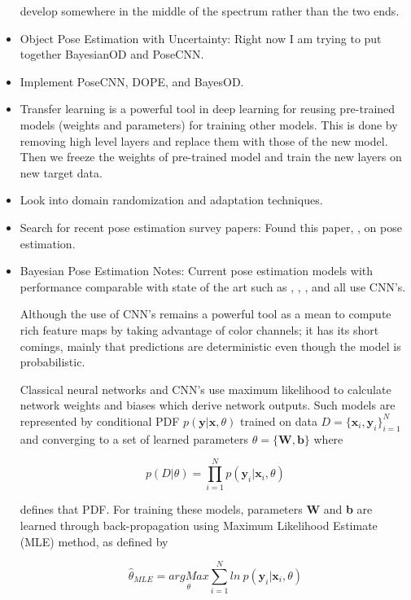 \documentclass[11pt]{article}
\begin{document}
\begin{itemize}
	      develop somewhere in the middle of the spectrum rather than the two ends.
	\item Object Pose Estimation with Uncertainty: Right now I am trying to put
	      together BayesianOD and PoseCNN.
	\item Implement PoseCNN, DOPE, and BayesOD.
	\item Transfer learning is a powerful tool in deep learning for reusing pre-trained
	      models (weights and parameters) for training other models. This is done by
	      removing high level layers and replace them with those of the new model. Then
	      we freeze the weights of pre-trained model and train the new layers on new
	      target data.
	\item Look into domain randomization and adaptation techniques.
	\item Search for recent pose estimation survey papers: Found this paper,
	      \cite{du2020vision}, on pose estimation.
	\item Bayesian Pose Estimation Notes: Current pose estimation models with
	      performance comparable with state of the art such as \cite{xiang2018posecnn},
	      \cite{Dope}, \cite{MoreFusion}, and \cite{DenseFusion} all use CNN's.

	      Although the use of CNN's remains a powerful tool as a mean to compute rich
	      feature maps by taking advantage of color channels; it has its short
	      comings, mainly that predictions are deterministic even though the model
	      is probabilistic.

	      Classical neural networks and CNN's use maximum likelihood to calculate
	      network weights and biases which derive network outputs. Such models are
	      represented by conditional PDF \( p(\textbf{y} | \textbf{x}, \theta) \)
	      trained on data \( D = \{ \textbf{x}_{i},\textbf{y}_{i} \}_{i = 1}^{N} \)
	      and converging to a set of learned parameters
	      \( \theta = \{ \textbf{W}, \textbf{b} \}\) where

	      $$ p(D| \theta) = \prod_{i = 1}^{N}  p(\textbf{y}_{i} |\textbf{x}_{i}, \theta)  $$

	      defines that PDF. For training these models, parameters \textbf{W} and
	      \textbf{b} are learned through back-propagation using Maximum Likelihood
	      Estimate (MLE) method, as defined by

	      $$ \hat{\theta}_{MLE} = \underset{\theta}{argMax} \sum_{i = 1}^{N} ln ~p(\textbf{y}_{i} | \textbf{x}_{i}, \theta) $$




\end{itemize}
\end{document}
